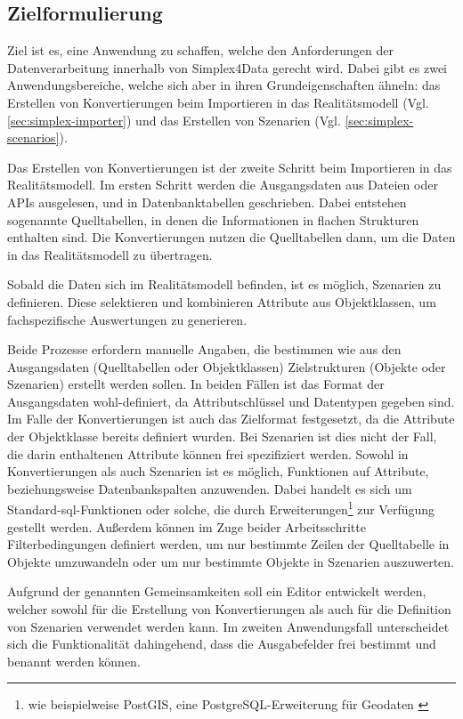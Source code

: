 \subsection{Zielformulierung}

Ziel ist es, eine Anwendung zu schaffen, welche den Anforderungen der Datenverarbeitung innerhalb von Simplex4Data gerecht wird. Dabei gibt es zwei Anwendungsbereiche, welche sich aber in ihren Grundeigenschaften ähneln: das Erstellen von Konvertierungen beim Importieren in das Realitätsmodell (Vgl. \ref{sec:simplex-importer}) und das Erstellen von Szenarien (Vgl. \ref{sec:simplex-scenarios}).

Das Erstellen von Konvertierungen ist der zweite Schritt beim Importieren in das Realitätsmodell. Im ersten Schritt werden die Ausgangsdaten aus Dateien oder APIs ausgelesen, und in Datenbanktabellen geschrieben. Dabei entstehen sogenannte Quelltabellen, in denen die Informationen in flachen Strukturen enthalten sind. Die Konvertierungen nutzen die Quelltabellen dann, um die Daten in das Realitätsmodell zu übertragen.

Sobald die Daten sich im Realitätsmodell befinden, ist es möglich, Szenarien zu definieren. Diese selektieren und kombinieren Attribute aus Objektklassen, um fachspezifische Auswertungen zu generieren.

Beide Prozesse erfordern manuelle Angaben, die bestimmen wie aus den Ausgangsdaten (Quelltabellen oder Objektklassen) Zielstrukturen (Objekte oder Szenarien) erstellt werden sollen. In beiden Fällen ist das Format der Ausgangsdaten wohl-definiert, da Attributschlüssel und Datentypen gegeben sind. Im Falle der Konvertierungen ist auch das Zielformat festgesetzt, da die Attribute der Objektklasse bereits definiert wurden. Bei Szenarien ist dies nicht der Fall, die darin enthaltenen Attribute können frei spezifiziert werden. Sowohl in Konvertierungen als auch Szenarien ist es möglich, Funktionen auf Attribute, beziehungsweise Datenbankspalten anzuwenden. Dabei handelt es sich um Standard-\ac{sql}-Funktionen oder solche, die durch Erweiterungen\footnote{wie beispielweise PostGIS, eine PostgreSQL-Erweiterung für Geodaten \parencite{postgispscPostGIS}} zur Verfügung gestellt werden. Außerdem können im Zuge beider Arbeitsschritte Filterbedingungen definiert werden, um nur bestimmte Zeilen der Quelltabelle in Objekte umzuwandeln oder um nur bestimmte Objekte in Szenarien auszuwerten.

Aufgrund der genannten Gemeinsamkeiten soll ein Editor entwickelt werden, welcher sowohl für die Erstellung von Konvertierungen als auch für die Definition von Szenarien verwendet werden kann. Im zweiten Anwendungsfall unterscheidet sich die Funktionalität dahingehend, dass die Ausgabefelder frei bestimmt und benannt werden können.

